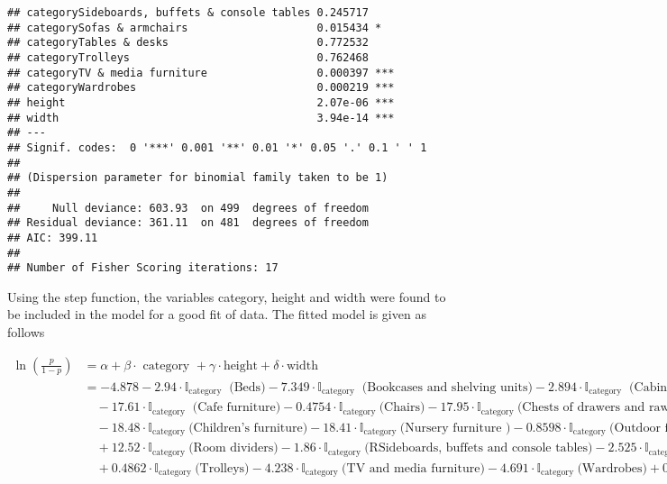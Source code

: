 \documentclass[
]{article}
\begin{document}
\begin{verbatim}
## categorySideboards, buffets & console tables 0.245717    
## categorySofas & armchairs                    0.015434 *  
## categoryTables & desks                       0.772532    
## categoryTrolleys                             0.762468    
## categoryTV & media furniture                 0.000397 ***
## categoryWardrobes                            0.000219 ***
## height                                       2.07e-06 ***
## width                                        3.94e-14 ***
## ---
## Signif. codes:  0 '***' 0.001 '**' 0.01 '*' 0.05 '.' 0.1 ' ' 1
## 
## (Dispersion parameter for binomial family taken to be 1)
## 
##     Null deviance: 603.93  on 499  degrees of freedom
## Residual deviance: 361.11  on 481  degrees of freedom
## AIC: 399.11
## 
## Number of Fisher Scoring iterations: 17
\end{verbatim}

Using the step function, the variables category, height and width were
found to be included in the model for a good fit of data. The fitted
model is given as follows

\[
\begin{equation}
\begin{split}\ln \left(\frac{p}{1-p}\right) &=\alpha+\beta \cdot \text { category }+\gamma \cdot \text{height}+\delta \cdot \text{width} \\&= -4.878-2.94 \cdot \mathbb{I}_{\text {category }} \text { (Beds)}-7.349 \cdot \mathbb{I}_{\text {category }} \text { (Bookcases and shelving units)}-2.894 \cdot \mathbb{I}_{\text {category }} \text { (Cabinets and cupboards)} \\&\quad -17.61 \cdot \mathbb{I}_{\text {category }} \text { (Cafe furniture)} -0.4754\cdot \mathbb{I}_{\text {category }} \text {(Chairs)} -17.95\cdot \mathbb{I}_{\text {category }} \text {(Chests of drawers and rawer units)} \\&\quad -18.48\cdot \mathbb{I}_{\text {category }} \text {(Children’s furniture)}-18.41\cdot \mathbb{I}_{\text {category }} \text {(Nursery furniture )}-0.8598\cdot \mathbb{I}_{\text {category }} \text {(Outdoor furniture)} \\&\quad +12.52\cdot \mathbb{I}_{\text {category }} \text {(Room dividers)}-1.86\cdot \mathbb{I}_{\text {category }} \text {(RSideboards, buffets and console tables)}-2.525\cdot \mathbb{I}_{\text {category }} \text {(Sofas and armchairs)}-0.2582\cdot \mathbb{I}_{\text {category }} \text {(Tables and desks)} \\&\quad +0.4862\cdot \mathbb{I}_{\text {category }} \text {(Trolleys)}-4.238\cdot \mathbb{I}_{\text {category }} \text {(TV and media furniture)}-4.691\cdot \mathbb{I}_{\text {category }} \text {(Wardrobes)}+0.0248\cdot \text{height}+0.03524\cdot \text{width}\end{split}
\end{equation}
\]
\end{document}
